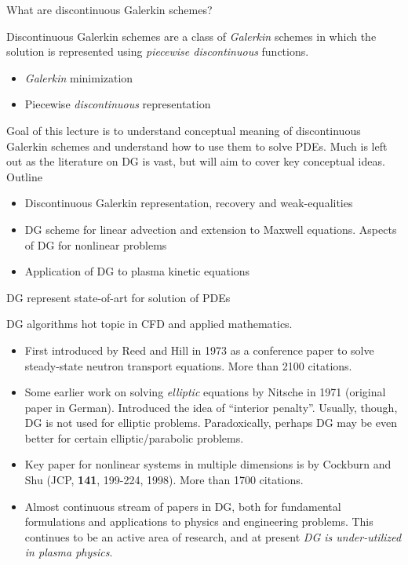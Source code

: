 \documentclass[aspectratio=169]{beamer}
\newcommand{\mypause}{}
\begin{document}
\begin{frame}{What are discontinuous Galerkin schemes?}

  \begin{block}{}
    Discontinuous Galerkin schemes are a class of \emph{Galerkin}
    schemes in which the solution is represented using \emph{piecewise
      discontinuous} functions.
  \end{block}
  \mypause
  \begin{itemize}
    \item \emph{Galerkin} minimization
    \item Piecewise \emph{discontinuous} representation
  \end{itemize}
  \mypause
  Goal of this lecture is to understand conceptual meaning of
  discontinuous Galerkin schemes and understand how to use them to
  solve PDEs. Much is left out as the literature on DG is vast, but
  will aim to cover key conceptual ideas. Outline

  \begin{itemize}
  \item Discontinuous Galerkin representation, recovery and
    weak-equalities
  \item DG scheme for linear advection and extension to Maxwell
    equations. Aspects of DG for nonlinear problems
  \item Application of DG to plasma kinetic equations
  \end{itemize}  
  
\end{frame}  

\begin{frame}{DG represent state-of-art for solution of PDEs}

  DG algorithms hot topic in CFD and applied mathematics.
  \begin{itemize}
    \small
  \item First introduced by Reed and Hill in 1973 as a conference
    paper to solve steady-state neutron transport equations. More than
    2100 citations. \mypause
  \item Some earlier work on solving \emph{elliptic} equations by
    Nitsche in 1971 (original paper in German). Introduced the idea of
    ``interior penalty''. Usually, though, DG is not used for elliptic
    problems. Paradoxically, perhaps DG may be even better for certain
    elliptic/parabolic problems. \mypause
  \item Key paper for nonlinear systems in multiple dimensions is by
    Cockburn and Shu (JCP, {\bf 141}, 199-224, 1998). More than 1700
    citations. \mypause
  \item Almost continuous stream of papers in DG, both for fundamental
    formulations and applications to physics and engineering
    problems. This continues to be an active area of research, and at
    present \emph{DG is under-utilized in plasma physics}.
  \end{itemize}

\end{frame}
\end{document}

